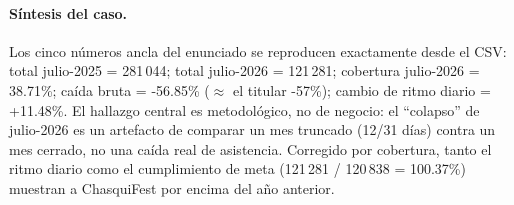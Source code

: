 \paragraph{Síntesis del caso.}
Los cinco números ancla del enunciado se reproducen exactamente desde el CSV: total julio-2025 = 281\,044; total julio-2026 = 121\,281; cobertura julio-2026 = 38.71\%; caída bruta = -56.85\% ($\approx$ el titular -57\%); cambio de ritmo diario = +11.48\%. El hallazgo central es metodológico, no de negocio: el \enquote{colapso} de julio-2026 es un artefacto de comparar un mes truncado (12/31 días) contra un mes cerrado, no una caída real de asistencia. Corregido por cobertura, tanto el ritmo diario como el cumplimiento de meta (121\,281 / 120\,838 = 100.37\%) muestran a ChasquiFest por encima del año anterior.
